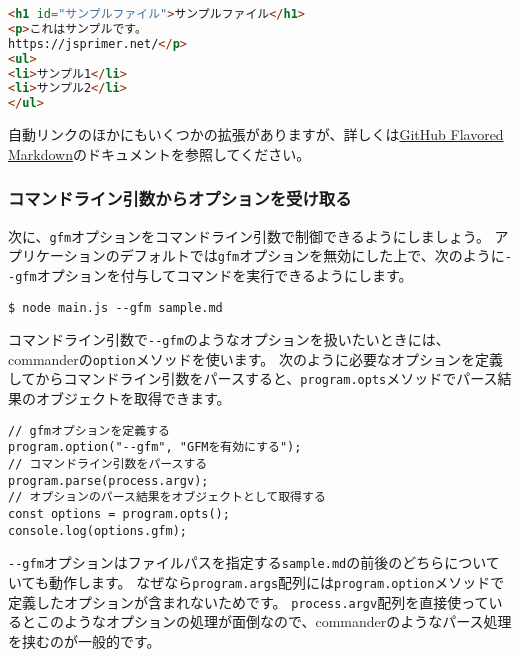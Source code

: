 \enlargethispage{\baselineskip}\begin{lstlisting}[language=HTML]
<h1 id="サンプルファイル">サンプルファイル</h1>
<p>これはサンプルです。
https://jsprimer.net/</p>
<ul>
<li>サンプル1</li>
<li>サンプル2</li>
</ul>
\end{lstlisting}

自動リンクのほかにもいくつかの拡張がありますが、詳しくは\href{https://github.github.com/gfm/}{GitHub
Flavored Markdown}のドキュメントを参照してください。

\hypertarget{receive-option}{%
\subsubsection{コマンドライン引数からオプションを受け取る}\label{receive-option}}

次に、\texttt{gfm}オプションをコマンドライン引数で制御できるようにしましょう。
アプリケーションのデフォルトでは\texttt{gfm}オプションを無効にした上で、次のように\texttt{-\/-gfm}オプションを付与してコマンドを実行できるようにします。

\begin{lstlisting}
$ node main.js --gfm sample.md
\end{lstlisting}

コマンドライン引数で\texttt{-\/-gfm}のようなオプションを扱いたいときには、commanderの\texttt{option}メソッドを使います。
次のように必要なオプションを定義してからコマンドライン引数をパースすると、\texttt{program.opts}メソッドでパース結果のオブジェクトを取得できます。

\begin{lstlisting}
// gfmオプションを定義する
program.option("--gfm", "GFMを有効にする");
// コマンドライン引数をパースする
program.parse(process.argv);
// オプションのパース結果をオブジェクトとして取得する
const options = program.opts();
console.log(options.gfm);
\end{lstlisting}

\texttt{-\/-gfm}オプションはファイルパスを指定する\texttt{sample.md}の前後のどちらについていても動作します。
なぜなら\texttt{program.args}配列には\texttt{program.option}メソッドで定義したオプションが含まれないためです。
\texttt{process.argv}配列を直接使っているとこのようなオプションの処理が面倒なので、commanderのようなパース処理を挟むのが一般的です。

